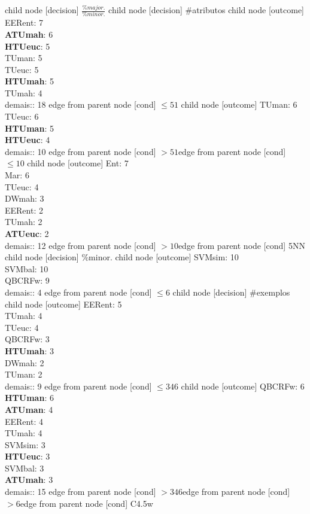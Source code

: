 child {node [decision] {$\frac{\%major.}{\%minor.}$}
child {node [decision] {\#atributos}
child {node [outcome] {EERent: 7\\
\textbf{ATUmah}: 6\\
\textbf{HTUeuc}: 5\\
TUman: 5\\
TUeuc: 5\\
\textbf{HTUmah}: 5\\
TUmah: 4\\
demais:: 18} edge from parent node [cond] {$\leq51$}}
child {node [outcome] {TUman: 6\\
TUeuc: 6\\
\textbf{HTUman}: 5\\
\textbf{HTUeuc}: 4\\
demais:: 10} edge from parent node [cond] {$>51$}}edge from parent node [cond] {$\leq10$}}
child {node [outcome] {Ent: 7\\
Mar: 6\\
TUeuc: 4\\
DWmah: 3\\
EERent: 2\\
TUmah: 2\\
\textbf{ATUeuc}: 2\\
demais:: 12} edge from parent node [cond] {$>10$}}edge from parent node [cond] {5NN}}
child {node [decision] {\%minor.}
child {node [outcome] {SVMsim: 10\\
SVMbal: 10\\
QBCRFw: 9\\
demais:: 4} edge from parent node [cond] {$\leq 6$}}
child {node [decision] {\#exemplos}
child {node [outcome] {EERent: 5\\
TUmah: 4\\
TUeuc: 4\\
QBCRFw: 3\\
\textbf{HTUmah}: 3\\
DWmah: 2\\
TUman: 2\\
demais:: 9} edge from parent node [cond] {$\leq346$}}
child {node [outcome] {QBCRFw: 6\\
\textbf{HTUman}: 6\\
\textbf{ATUman}: 4\\
EERent: 4\\
TUmah: 4\\
SVMsim: 3\\
\textbf{HTUeuc}: 3\\
SVMbal: 3\\
\textbf{ATUmah}: 3\\
demais:: 15} edge from parent node [cond] {$>346$}}edge from parent node [cond] {$> 6$}}edge from parent node [cond] {C4.5w}}
